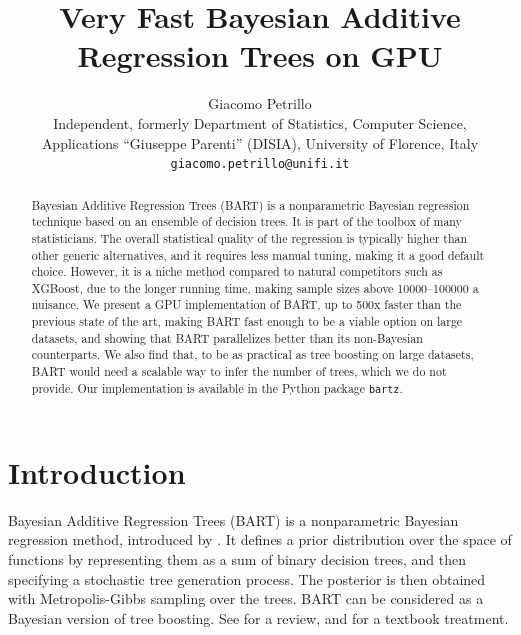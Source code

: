 \documentclass{article}
\title{Very Fast Bayesian Additive Regression Trees on GPU}
\author{%
  Giacomo Petrillo\\
  Independent, formerly Department of Statistics, Computer Science,\\
  Applications ``Giuseppe Parenti'' (DISIA), University of Florence, Italy\\
  \texttt{giacomo.petrillo@unifi.it}\\
}
\begin{document}
\maketitle

\begin{abstract}

	Bayesian Additive Regression Trees (BART) is a nonparametric Bayesian
	regression technique based on an ensemble of decision trees. It is part
	of the toolbox of many statisticians. The overall statistical quality
	of the regression is typically higher than other generic alternatives,
	and it requires less manual tuning, making it a good default choice.
	However, it is a niche method compared to natural competitors such as
	XGBoost, due to the longer running time, making sample sizes
	above \num{10000}--\num{100000} a nuisance. We present a GPU
	implementation of BART, up to 500x faster than the previous state of
	the art, making BART fast enough to be a viable option on large
	datasets, and showing that BART parallelizes better than its
	non-Bayesian counterparts. We also find that, to be as practical as
	tree boosting on large datasets, BART would need a scalable way to
	infer the number of trees, which we do not provide. Our implementation is available in the
	Python package \texttt{bartz}.

\end{abstract}

\section{Introduction}
\label{sec:intro}

Bayesian Additive Regression Trees (BART) is a nonparametric Bayesian regression
method, introduced by \citet{chipman2006,chipman2010}. It defines a prior
distribution over the space of functions by representing them as a sum of binary
decision trees, and then specifying a stochastic tree generation process. The
posterior is then obtained with Metropolis-Gibbs sampling over the trees. BART
can be considered as a Bayesian version of tree boosting. See \citet{hill2020}
for a review, and \citet[ch.~5]{daniels2023} for a textbook treatment.
\end{document}
